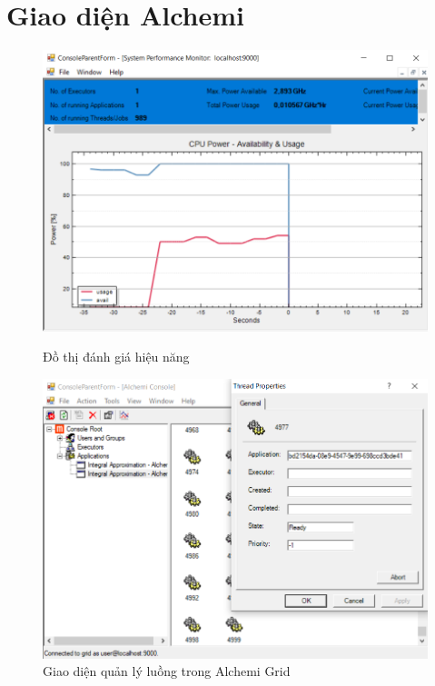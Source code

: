 \documentclass[12pt,a4paper]{report}
\begin{document}
\section{Giao diện Alchemi}
\begin{center}
    \begin{figure}[htp]
    \begin{center}
     	\includegraphics[scale=.6]{./Figures/IntegralCalculator/Graph}
     	\caption{Đồ thị đánh giá hiệu năng}
  
     	\includegraphics[scale=.6]{./Figures/IntegralCalculator/Manage}
    	\caption{Giao diện quản lý luồng trong Alchemi Grid}
    \end{center}
    \end{figure}
\end{center}
\end{document}
